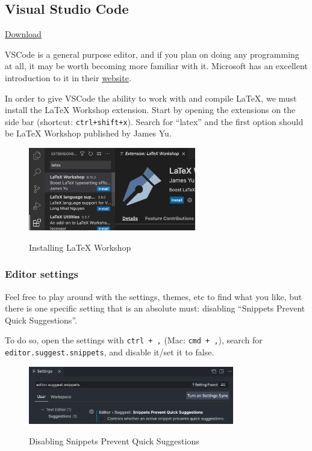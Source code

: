 \subsection{Visual Studio Code}
\href{https://code.visualstudio.com/}{Download}

VSCode is a general purpose editor, and if you plan on doing any programming at all, it may be worth becoming more familiar with it.
Microsoft has an excellent introduction to it in their \href{https://code.visualstudio.com/docs}{website}.

In order to give VSCode the ability to work with and compile \LaTeX{}, we must install the LaTeX Workshop extension.
Start by opening the extensions on the side bar (shortcut: \texttt{ctrl+shift+x}).
Search for ``latex'' and the first option should be LaTeX Workshop published by James Yu.

\begin{figure}[h]
\centering
    \includegraphics[width=0.65\textwidth]{figures/extension.png}
\label{fig:extension}
\caption{Installing LaTeX Workshop}
\end{figure}

\subsubsection{Editor settings}
Feel free to play around with the settings, themes, etc to find what you like, but there is one specific setting that is an absolute must:
disabling ``Snippets Prevent Quick Suggestions''.

To do so, open the settings with \texttt{ctrl + ,} (Mac: \texttt{cmd + ,}), search for \texttt{editor.suggest.snippets}, and disable it/set it to false.

\begin{figure}[h]
\centering
    \includegraphics[width=0.8\textwidth]{figures/quick-suggests.png}
    \label{fig:quick-suggests}
    \caption{Disabling Snippets Prevent Quick Suggestions}
\end{figure}

